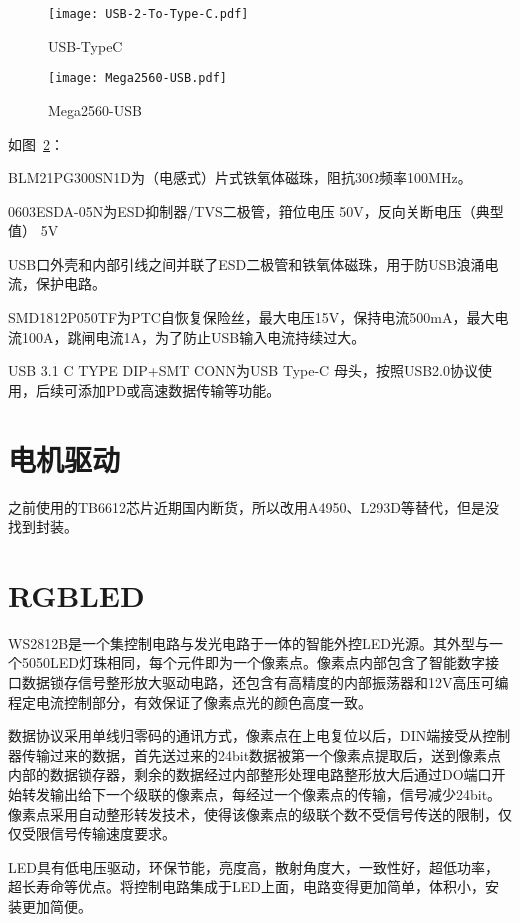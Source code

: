 \begin{figure}[htbp]
    \centering
    \texttt{[image: USB-2-To-Type-C.pdf]}
    \caption{USB-TypeC}
    \label{fig:USB-TypeC}
\end{figure}



\begin{figure}[htbp]
    \centering
    \texttt{[image: Mega2560-USB.pdf]}
    \caption{Mega2560-USB}
    \label{fig:Mega2560-USB}
\end{figure}

如图~\ref{fig:Mega2560-USB}：

BLM21PG300SN1D为（电感式）片式铁氧体磁珠，阻抗30Ω频率100MHz。

0603ESDA-05N为ESD抑制器/TVS二极管，箝位电压	50V，反向关断电压（典型值）	5V

USB口外壳和内部引线之间并联了ESD二极管和铁氧体磁珠，用于防USB浪涌电流，保护电路。

SMD1812P050TF为PTC自恢复保险丝，最大电压15V，保持电流500mA，最大电流100A，跳闸电流1A，为了防止USB输入电流持续过大。

USB 3.1 C TYPE DIP+SMT CONN为USB Type-C 母头，按照USB2.0协议使用，后续可添加PD或高速数据传输等功能。


\section{电机驱动}
之前使用的TB6612芯片近期国内断货，所以改用A4950、L293D等替代，但是没找到封装。

\section{RGBLED}

WS2812B是一个集控制电路与发光电路于一体的智能外控LED光源。其外型与一个5050LED灯珠相同，每个元件即为一个像素点。像素点内部包含了智能数字接口数据锁存信号整形放大驱动电路，还包含有高精度的内部振荡器和12V高压可编程定电流控制部分，有效保证了像素点光的颜色高度一致。

数据协议采用单线归零码的通讯方式，像素点在上电复位以后，DIN端接受从控制器传输过来的数据，首先送过来的24bit数据被第一个像素点提取后，送到像素点内部的数据锁存器，剩余的数据经过内部整形处理电路整形放大后通过DO端口开始转发输出给下一个级联的像素点，每经过一个像素点的传输，信号减少24bit。像素点采用自动整形转发技术，使得该像素点的级联个数不受信号传送的限制，仅仅受限信号传输速度要求。

LED具有低电压驱动，环保节能，亮度高，散射角度大，一致性好，超低功率，超长寿命等优点。将控制电路集成于LED上面，电路变得更加简单，体积小，安装更加简便。


